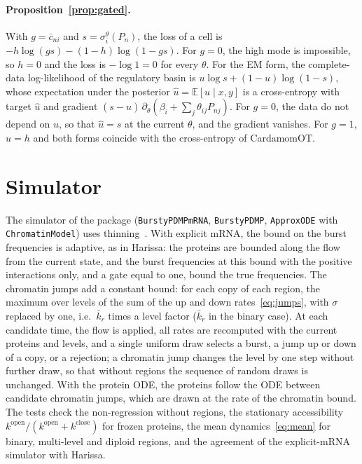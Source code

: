 \documentclass[a4paper, 11pt]{article}
\newcommand{\E}{\mathbb{E}}
\newcommand{\kop}{k^{\mathrm{open}}}
\newcommand{\kcl}{k^{\mathrm{close}}}
\newcommand{\cbar}{\bar c}
\theoremstyle{plain}
\theoremstyle{remark}
\begin{document}
\paragraph{Proposition~\ref{prop:gated}.} With $g = \cbar_{ni}$ and $s = \sigma_i^\theta(P_n)$, the loss of a cell is $-h\log(gs) - (1-h)\log(1-gs)$. For $g = 0$, the high mode is impossible, so $h = 0$ and the loss is $-\log 1 = 0$ for every $\theta$. For the EM form, the complete-data log-likelihood of the regulatory basin is $u\log s + (1-u)\log(1-s)$, whose expectation under the posterior $\hat u = \E[u \mid x, y]$ is a cross-entropy with target $\hat u$ and gradient $(s - \hat u)\,\partial_\theta(\beta_i + \sum_j\theta_{ij}P_{nj})$. For $g = 0$, the data do not depend on $u$, so that $\hat u = s$ at the current $\theta$, and the gradient vanishes. For $g = 1$, $\hat u = h$ and both forms coincide with the cross-entropy of CardamomOT.

\section{Simulator}\label{app:simulator}

The simulator of the package (\texttt{BurstyPDMPmRNA}, \texttt{BurstyPDMP}, \texttt{ApproxODE} with \texttt{ChromatinModel}) uses thinning~\cite{lewis1979thinning}. With explicit mRNA, the bound on the burst frequencies is adaptive, as in Harissa: the proteins are bounded along the flow from the current state, and the burst frequencies at this bound with the positive interactions only, and a gate equal to one, bound the true frequencies. The chromatin jumps add a constant bound: for each copy of each region, the maximum over levels of the sum of the up and down rates~\eqref{eq:jumps}, with $\sigma$ replaced by one, i.e.\ $\bar k_r$ times a level factor ($\bar k_r$ in the binary case). At each candidate time, the flow is applied, all rates are recomputed with the current proteins and levels, and a single uniform draw selects a burst, a jump up or down of a copy, or a rejection; a chromatin jump changes the level by one step without further draw, so that without regions the sequence of random draws is unchanged. With the protein ODE, the proteins follow the ODE between candidate chromatin jumps, which are drawn at the rate of the chromatin bound. The tests check the non-regression without regions, the stationary accessibility $\kop/(\kop + \kcl)$ for frozen proteins, the mean dynamics~\eqref{eq:mean} for binary, multi-level and diploid regions, and the agreement of the explicit-mRNA simulator with Harissa.
\end{document}
